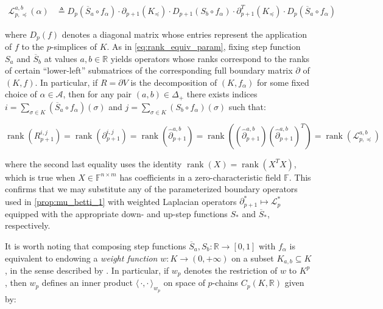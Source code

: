 \documentclass[pdflatex,sn-mathphys-num]{sn-jnl}
\begin{document}
\[\begin{aligned}
\mathcal{L}_{p, \preceq}^{a,b}(\alpha) & \triangleq D_{p}\left( {\overline{S}}_{a} \circ f_{\alpha} \right) \cdot \partial_{p + 1} \left( K_{\preceq} \right)  \cdot D_{p + 1}\left( S_{b} \circ f_{\alpha} \right) \cdot \partial_{p + 1}^{T} \left( K_{\preceq} \right)  \cdot D_{p}\left( {\overline{S}}_{a} \circ f_{\alpha} \right)
\end{aligned}\] \protect{}\label{eq:laplacian_decouple}{}

where \(D_{p}(f)\) denotes a diagonal matrix whose entries represent the application of \(f\) to the \(p\)-simplices of \(K\). As in \ref{eq:rank_equiv_param}, fixing step function \(S_{a}\) and \({\overline{S}}_{b}\) at values \(a,b \in \mathbb{R}\) yields operators whose ranks correspond to the ranks of certain ``lower-left'' submatrices of the corresponding full boundary matrix \(\partial\) of \((K,f)\). In particular, if \(R = \partial V\) is the decomposition of \(\left( K,f_{\alpha} \right)\) for some fixed choice of \(\alpha \in \mathcal{A}\), then for any pair \((a,b) \in \Delta_{+}\) there exists indices \(i = \sum_{\sigma \in K}\left( {\overline{S}}_{a} \circ f_{\alpha} \right)(\sigma)\) and \(j = \sum_{\sigma \in K}\left( S_{b} \circ f_{\alpha} \right)(\sigma)\) such that:

\[\operatorname{rank} \left( R_{p + 1}^{i,j} \right)  = \operatorname{rank} \left( \partial_{p + 1}^{i,j} \right)  = \operatorname{rank} \left( {\hat{\partial}}_{p + 1}^{a,b} \right)  = \operatorname{rank} \left(  \left( {\hat{\partial}}_{p + 1}^{a,b} \right)  \left( {\hat{\partial}}_{p + 1}^{a,b} \right) ^{T} \right)  = \operatorname{rank} \left( \mathcal{L}_{p, \preceq}^{a,b} \right) \]

where the second last equality uses the identity \(\operatorname{rank}(X) = \operatorname{rank} \left( X^{T}X \right) \), which is true when \(X \in \mathbb{F}^{n \times m}\) has coefficients in a zero-characteristic field \(\mathbb{F}\). This confirms that we may substitute any of the parameterized boundary operators used in \ref{prop:mu_betti_1} with weighted Laplacian operators \(\partial_{p + 1}^{\ast} \mapsto \mathcal{L}_{p}^{\ast}\) equipped with the appropriate down- and up-step functions \(S_{\ast}\) and \({\overline{S}}_{\ast}\), respectively.

It is worth noting that composing step functions \({\overline{S}}_{a},S_{b}:\mathbb{R} \rightarrow  [ 0,1] \) with \(f_{\alpha}\) is equivalent to endowing a \emph{weight function} \(w:K \rightarrow (0, + \infty)\) on a subset \(K_{a,b} \subseteq K\), in the sense described by \cite{memoli2022persistent}. In particular, if \(w_{p}\) denotes the restriction of \(w\) to \(K^{p}\), then \(w_{p}\) defines an inner product \(\langle\, \cdot , \cdot \,\rangle_{w_{p}}\) on space of \(p\)-chains \(C_{p}\left( K,\mathbb{R} \right)\) given by:
\end{document}
